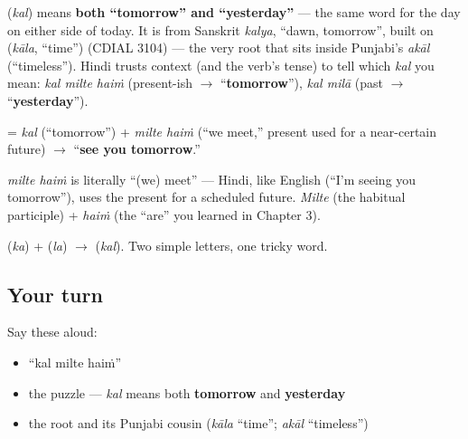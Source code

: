 \begin{cousinweb}
\textbf{} (\emph{kal}) means \textbf{both \textquotedblleft{}tomorrow\textquotedblright{} and \textquotedblleft{}yesterday\textquotedblright{}} — the same word for the day on either side of today. It is from Sanskrit \emph{kalya}, \textquotedblleft{}dawn, tomorrow\textquotedblright{}, built on \textbf{} (\emph{kāla}, \textquotedblleft{}time\textquotedblright{}) (CDIAL 3104) — the very root that sits inside Punjabi's \emph{akāl} (\textquotedblleft{}timeless\textquotedblright{}). Hindi trusts context (and the verb's tense) to tell which \emph{kal} you mean: \emph{kal milte haiṁ} (present-ish $\to$ \textquotedblleft{}\textbf{tomorrow}\textquotedblright{}), \emph{kal milā} (past $\to$ \textquotedblleft{}\textbf{yesterday}\textquotedblright{}).

\textbf{  } = \emph{kal} (\textquotedblleft{}tomorrow\textquotedblright{}) + \emph{milte haiṁ} (\textquotedblleft{}we meet,\textquotedblright{} present used for a near-certain future) $\to$ \textquotedblleft{}\textbf{see you tomorrow}.\textquotedblright{}
\end{cousinweb}

\begin{grammarlens}[title={Grammar Lens: the present-for-future}]
\emph{milte haiṁ} is literally \textquotedblleft{}(we) meet\textquotedblright{} — Hindi, like English (\textquotedblleft{}I'm seeing you tomorrow\textquotedblright{}), uses the present for a scheduled future. \emph{Milte} (the habitual participle) + \emph{haiṁ} (the \textquotedblleft{}are\textquotedblright{} you learned in Chapter 3).
\end{grammarlens}

\begin{sounds}
 (\emph{ka}) +  (\emph{la}) $\to$  (\emph{kal}). Two simple letters, one tricky word.
\end{sounds}

\subsection*{Your turn}
Say these aloud:

\begin{itemize}
\raggedright
  \item \textquotedblleft{}kal milte haiṁ\textquotedblright{}
  \item the puzzle — \emph{kal} means both \textbf{tomorrow} and \textbf{yesterday}
  \item the root and its Punjabi cousin (\emph{kāla} \textquotedblleft{}time\textquotedblright{}; \emph{akāl} \textquotedblleft{}timeless\textquotedblright{})
\end{itemize}

